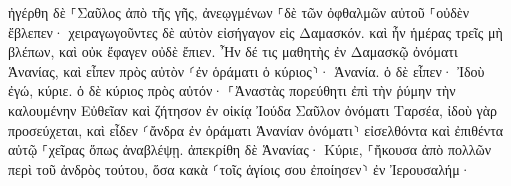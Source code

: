 \documentclass{openreader}
\begin{document}
ἠγέρθη δὲ ⸀Σαῦλος ἀπὸ τῆς γῆς, ἀνεῳγμένων ⸀δὲ τῶν ὀφθαλμῶν αὐτοῦ ⸀οὐδὲν ἔβλεπεν· χειραγωγοῦντες δὲ αὐτὸν εἰσήγαγον εἰς Δαμασκόν. 
καὶ ἦν ἡμέρας τρεῖς μὴ βλέπων, καὶ οὐκ ἔφαγεν οὐδὲ ἔπιεν. 
Ἦν δέ τις μαθητὴς ἐν Δαμασκῷ ὀνόματι Ἁνανίας, καὶ εἶπεν πρὸς αὐτὸν ⸂ἐν ὁράματι ὁ κύριος⸃· Ἁνανία. ὁ δὲ εἶπεν· Ἰδοὺ ἐγώ, κύριε. 
ὁ δὲ κύριος πρὸς αὐτόν· ⸀Ἀναστὰς πορεύθητι ἐπὶ τὴν ῥύμην τὴν καλουμένην Εὐθεῖαν καὶ ζήτησον ἐν οἰκίᾳ Ἰούδα Σαῦλον ὀνόματι Ταρσέα, ἰδοὺ γὰρ προσεύχεται, 
καὶ εἶδεν ⸂ἄνδρα ἐν ὁράματι Ἁνανίαν ὀνόματι⸃ εἰσελθόντα καὶ ἐπιθέντα αὐτῷ ⸀χεῖρας ὅπως ἀναβλέψῃ. 
ἀπεκρίθη δὲ Ἁνανίας· Κύριε, ⸀ἤκουσα ἀπὸ πολλῶν περὶ τοῦ ἀνδρὸς τούτου, ὅσα κακὰ ⸂τοῖς ἁγίοις σου ἐποίησεν⸃ ἐν Ἰερουσαλήμ· 
\end{document}
